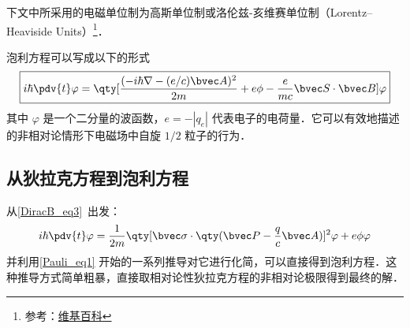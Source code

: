 

下文中所采用的电磁单位制为高斯单位制或洛伦兹-亥维赛单位制（Lorentz–Heaviside Units）\footnote{参考：\href{https://en.wikipedia.org/wiki/Lorentz–Heaviside_units}{维基百科}}．

泡利方程可以写成以下的形式
\begin{equation}
\boxed{
i\hbar\pdv{t} \varphi = \qty[\frac{(-i\hbar\nabla - (e/c)\bvec A)^2}{2m}+e\phi-\frac{e}{mc}\bvec S\cdot \bvec B]\varphi}
\end{equation}
其中 $\varphi$ 是一个二分量的波函数，$e=-|q_e|$ 代表电子的电荷量．它可以有效地描述的非相对论情形下电磁场中自旋 $1/2$ 粒子的行为．
\subsection{从狄拉克方程到泡利方程}
从\autoref{DiracB_eq3}~出发：
\begin{equation}
i\hbar\pdv{t} \varphi = \frac{1}{2m}\qty[\bvec \sigma \cdot\qty(\bvec P - \frac{q}{c}\bvec A)]^2 \varphi + e\phi  \varphi
\end{equation}
并利用\autoref{Pauli_eq1} 开始的一系列推导对它进行化简，可以直接得到泡利方程．这种推导方式简单粗暴，直接取相对论性狄拉克方程的非相对论极限得到最终的解．
